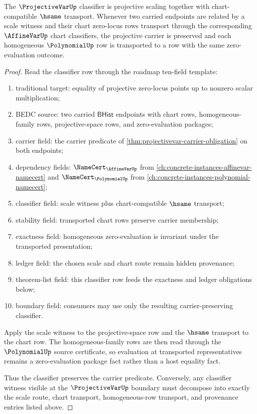 \begin{theorem}
\label{thm:projectivevar-classifier-stability-obligation}
The $\ProjectiveVarUp$ classifier is projective scaling together with chart-compatible $\hsame$ transport. Whenever two carried endpoints are related by a scale witness and their chart zero-locus rows transport through the corresponding $\AffineVarUp$ chart classifiers, the projective carrier is preserved and each homogeneous $\PolynomialUp$ row is transported to a row with the same zero-evaluation outcome.
\end{theorem}
\begin{proof}
Read the classifier row through the roadmap ten-field template:
\begin{enumerate}
  \item traditional target: equality of projective zero-locus points up to nonzero scalar multiplication;
  \item BEDC source: two carried $\mathsf{BHist}$ endpoints with chart rows, homogeneous-family rows, projective-space rows, and zero-evaluation packages;
  \item carrier field: the carrier predicate of \autoref{thm:projectivevar-carrier-obligation} on both endpoints;
  \item dependency fields: $\NameCert_{\AffineVarUp}$ from \autoref{ch:concrete-instances-affinevar-namecert} and $\NameCert_{\PolynomialUp}$ from \autoref{ch:concrete-instances-polynomial-namecert};
  \item classifier field: scale witness plus chart-compatible $\hsame$ transport;
  \item stability field: transported chart rows preserve carrier membership;
  \item exactness field: homogeneous zero-evaluation is invariant under the transported presentation;
  \item ledger field: the chosen scale and chart route remain hidden provenance;
  \item theorem-list field: this classifier row feeds the exactness and ledger obligations below;
  \item boundary field: consumers may use only the resulting carrier-preserving classifier.
\end{enumerate}

Apply the scale witness to the projective-space row and the $\hsame$ transport to the chart row. The homogeneous-family rows are then read through the $\PolynomialUp$ source certificate, so evaluation at transported representatives remains a zero-evaluation package fact rather than a host equality fact.

Thus the classifier preserves the carrier predicate. Conversely, any classifier witness visible at the $\ProjectiveVarUp$ boundary must decompose into exactly the scale route, chart transport, homogeneous-row transport, and provenance entries listed above.
\end{proof}
